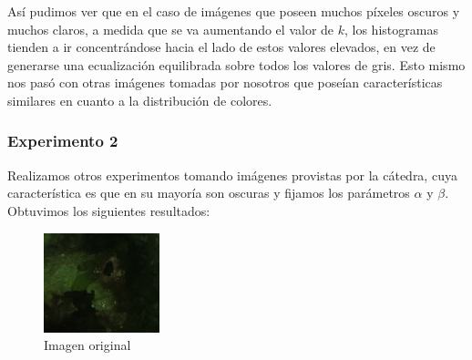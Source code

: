 \documentclass[10pt, a4paper]{article}
\begin{document}
\begin{figure}[H]
\begin{subfigure}{0.3\textwidth}
    \end{subfigure}\hfill
\end{figure}

Así pudimos ver que en el caso de imágenes que poseen muchos píxeles oscuros y muchos claros, a medida que se va aumentando el valor de $k$, los histogramas tienden a ir concentrándose hacia el lado de estos valores elevados, en vez de generarse una ecualización equilibrada sobre todos los valores de gris. Esto mismo nos pasó con otras imágenes tomadas por nosotros que poseían características similares en cuanto a la distribución de colores. 

\subsubsection{Experimento 2}

Realizamos otros experimentos tomando imágenes provistas por la cátedra, cuya característica es que en su mayoría son oscuras y fijamos los parámetros $\alpha$ y $\beta$. Obtuvimos los siguientes resultados:

\begin{figure}[H]
	\centering
        \includegraphics[width=0.3\textwidth]{1906ax.png}
        \caption{Imagen original}
\end{figure}
\end{document}
